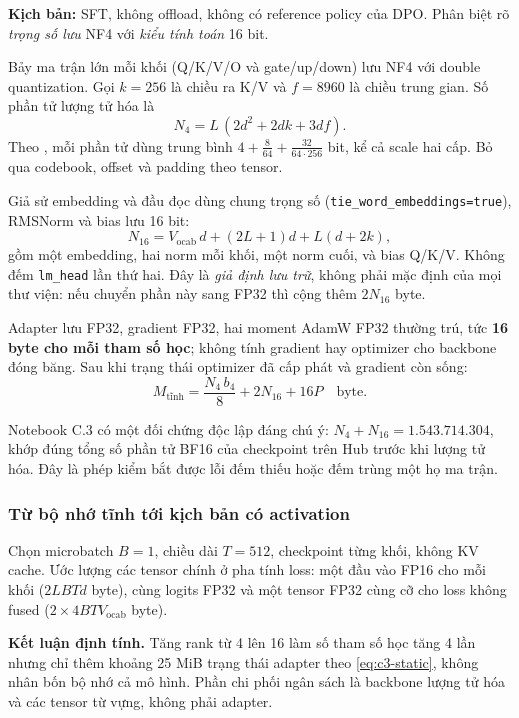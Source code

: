 \textbf{Kịch bản:} SFT, không offload, không có reference policy của DPO. Phân biệt
rõ \emph{trọng số lưu} NF4 với \emph{kiểu tính toán} 16 bit.

Bảy ma trận lớn mỗi khối (Q/K/V/O và gate/up/down) lưu NF4 với double
quantization. Gọi $k=256$ là chiều ra K/V và $f=8960$ là chiều trung gian. Số phần
tử lượng tử hóa là
\[
  N_4=L\,(2d^2+2dk+3df).
\]
Theo \cite[§3, tr.~5]{qlora}, mỗi phần tử dùng trung bình
$4+\tfrac{8}{64}+\tfrac{32}{64\cdot256}$ bit, kể cả scale hai cấp. Bỏ qua codebook,
offset và padding theo tensor.

Giả sử embedding và đầu đọc dùng chung trọng số
(\texttt{tie\_word\_embeddings=true}), RMSNorm và bias lưu 16 bit:
\[
  N_{16}=V_{\mathrm{ocab}}\,d+(2L+1)d+L(d+2k),
\]
gồm một embedding, hai norm mỗi khối, một norm cuối, và bias Q/K/V. Không đếm
\texttt{lm\_head} lần thứ hai. Đây là \emph{giả định lưu trữ}, không phải mặc định
của mọi thư viện: nếu chuyển phần này sang FP32 thì cộng thêm $2N_{16}$ byte.

Adapter lưu FP32, gradient FP32, hai moment AdamW FP32 thường trú, tức
\textbf{16 byte cho mỗi tham số học}; không tính gradient hay optimizer cho
backbone đóng băng. Sau khi trạng thái optimizer đã cấp phát và gradient còn sống:
\begin{equation}
  M_{\mathrm{tĩnh}}=\frac{N_4\,b_4}{8}+2N_{16}+16P \quad\text{byte}.
  \label{eq:c3-static}
\end{equation}

Notebook C.3 có một đối chứng độc lập đáng chú ý: $N_4+N_{16}=1{.}543{.}714{.}304$,
khớp đúng tổng số phần tử BF16 của checkpoint trên Hub trước khi lượng tử hóa. Đây
là phép kiểm bắt được lỗi đếm thiếu hoặc đếm trùng một họ ma trận.

\subsubsection{Từ bộ nhớ tĩnh tới kịch bản có activation}

Chọn microbatch $B=1$, chiều dài $T=512$, checkpoint từng khối, không KV cache.
Ước lượng các tensor chính ở pha tính loss: một đầu vào FP16 cho mỗi khối
($2LBTd$ byte), cùng logits FP32 và một tensor FP32 cùng cỡ cho loss không fused
($2\times4BTV_{\mathrm{ocab}}$ byte).

\textbf{Kết luận định tính.} Tăng rank từ 4 lên 16 làm số tham số học tăng 4 lần
nhưng chỉ thêm khoảng 25 MiB trạng thái adapter theo \eqref{eq:c3-static}, không
nhân bốn bộ nhớ cả mô hình. Phần chi phối ngân sách là backbone lượng tử hóa và các
tensor từ vựng, không phải adapter.

